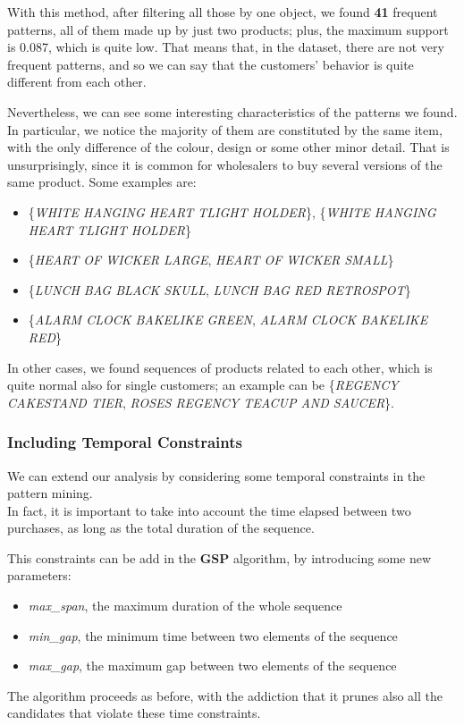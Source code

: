 With this method, after filtering all those by one object, we found \textbf{41} frequent patterns, all of them made up by just two products; plus, the maximum support is 0.087, which is quite low. That means that, in the dataset, there are not very frequent patterns, and so we can say that the customers' behavior is quite different from each other.

Nevertheless, we can see some interesting characteristics of the patterns we found.\\
In particular, we notice the majority of them are constituted by the same item, with the only difference of the colour, design or some other minor detail. That is unsurprisingly, since it is common for wholesalers to buy several versions of the same product. Some examples are:
\begin{itemize}
\item \{\emph{WHITE HANGING HEART TLIGHT HOLDER}\}, \{\emph{WHITE HANGING HEART TLIGHT HOLDER}\}
\item \{\emph{HEART OF WICKER LARGE}, \emph{HEART OF WICKER SMALL}\}
\item \{\emph{LUNCH BAG BLACK SKULL}, \emph{LUNCH BAG RED RETROSPOT}\}
\item \{\emph{ALARM CLOCK BAKELIKE GREEN}, \emph{ALARM CLOCK BAKELIKE RED}\}
\end{itemize}

In other cases, we found sequences of products related to each other, which is quite normal also for single customers; an example can be \{\emph{REGENCY CAKESTAND TIER}, \emph{ROSES REGENCY TEACUP AND SAUCER}\}.

\subsubsection{Including Temporal Constraints}
We can extend our analysis by considering some temporal constraints in the pattern mining.\\
In fact, it is important to take into account the time elapsed between two purchases, as long as the total duration of the sequence. 

This constraints can be add in the \textbf{GSP} algorithm, by introducing some new parameters:
\begin{itemize}
\item \emph{max\_span}, the maximum duration of the whole sequence
\item \emph{min\_gap}, the minimum time between two elements of the sequence
\item \emph{max\_gap}, the maximum gap between two elements of the sequence
\end{itemize}
The algorithm proceeds as before, with the addiction that it prunes also all the candidates that violate these time constraints.


